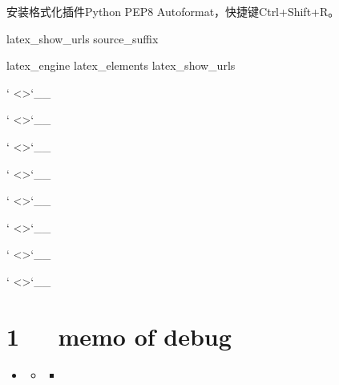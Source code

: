 \documentclass[letterpaper,12pt,english]{sphinxmanual}
\begin{document}
安装格式化插件Python PEP8 Autoformat，快捷键Ctrl+Shift+R。


latex\_show\_urls
source\_suffix


latex\_engine
latex\_elements
latex\_show\_urls




{}` \textless{}\textgreater{}{}`\_\_

{}` \textless{}\textgreater{}{}`\_\_

{}` \textless{}\textgreater{}{}`\_\_

{}` \textless{}\textgreater{}{}`\_\_

{}` \textless{}\textgreater{}{}`\_\_

{}` \textless{}\textgreater{}{}`\_\_

{}` \textless{}\textgreater{}{}`\_\_

{}` \textless{}\textgreater{}{}`\_\_


\chapter{1   memo of debug}
\label{\detokenize{000misc/memo-debug:memo-of-debug}}\label{\detokenize{000misc/memo-debug::doc}}
\begin{sphinxShadowBox}
\begin{itemize}
\item {} 
\label{\detokenize{000misc/memo-debug:id2}}{\hyperref[\detokenize{000misc/memo-debug:memo-of-debug}]{}}
\begin{itemize}
\item {} 
\label{\detokenize{000misc/memo-debug:id3}}{\hyperref[\detokenize{000misc/memo-debug:makefile}]{}}
\begin{itemize}
\item {} 
\label{\detokenize{000misc/memo-debug:id4}}{\hyperref[\detokenize{000misc/memo-debug:else}]{}}

\end{itemize}

\end{itemize}

\end{itemize}
\end{sphinxShadowBox}
\end{document}
